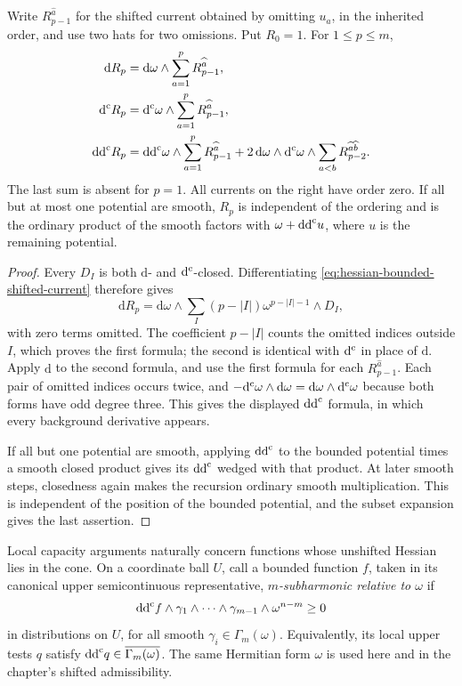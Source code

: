 \begin{proposition}\label{hessian:bounded-current-torsion}
Write $R_{p-1}^{\widehat a}$ for the shifted current obtained by
omitting $u_a$, in the inherited order, and use two hats for two
omissions. Put $R_0=1$. For $1\leq p\leq m$,
\[
 \begin{aligned}
 \mathrm dR_p&=\mathrm d\omega\wedge
                         \sum_{a=1}^pR_{p-1}^{\widehat a},\\
 \mathrm d^{\mathrm c} R_p&=\mathrm d^{\mathrm c}\omega\wedge
                         \sum_{a=1}^pR_{p-1}^{\widehat a},\\
 \mathrm{dd}^{\mathrm{c}} R_p&=\mathrm{dd}^{\mathrm{c}}\omega\wedge
                         \sum_{a=1}^pR_{p-1}^{\widehat a}
       +2\,\mathrm d\omega\wedge\mathrm d^{\mathrm c}\omega\wedge
                         \sum_{a<b}R_{p-2}^{\widehat a\widehat b}.
 \end{aligned}
\]
The last sum is absent for $p=1$. All currents on the right have order
zero. If all but at most one potential are smooth, $R_p$ is independent
of the ordering and is the ordinary product of the smooth factors
with $\omega+\mathrm{dd}^{\mathrm{c}} u$, where $u$ is the remaining potential.
\end{proposition}
\begin{proof}
Every $D_I$ is both $\mathrm d$- and $\mathrm d^{\mathrm c}$-closed. Differentiating
\eqref{eq:hessian-bounded-shifted-current} therefore gives
\[
 \mathrm dR_p=\mathrm d\omega\wedge
 \sum_I(p-|I|)\omega^{p-|I|-1}\wedge D_I,
\]
with zero terms omitted. The coefficient $p-|I|$ counts the omitted
indices outside $I$, which proves the first formula; the second is
identical with $\mathrm d^{\mathrm c}$ in place of $\mathrm d$. Apply $\mathrm d$ to
the second formula, and use the first formula for each
$R_{p-1}^{\widehat a}$. Each pair of omitted indices occurs twice, and
$-\mathrm d^{\mathrm c}\omega\wedge\mathrm d\omega
=\mathrm d\omega\wedge\mathrm d^{\mathrm c}\omega$ because both forms have odd
degree three. This gives the displayed $\mathrm{dd}^{\mathrm{c}}$ formula, in which every
background derivative appears.

If all but one potential are smooth, applying $\mathrm{dd}^{\mathrm{c}}$ to the bounded
potential times a smooth closed product gives its $\mathrm{dd}^{\mathrm{c}}$ wedged
with that product. At later smooth steps, closedness again makes
the recursion ordinary smooth multiplication. This is independent
of the position of the bounded potential, and the subset expansion
gives the last assertion.
\end{proof}

Local capacity arguments naturally concern functions whose unshifted
Hessian lies in the cone. On a coordinate ball $U$, call a bounded
function $f$, taken in its canonical upper semicontinuous representative,
\emph{$m$-subharmonic relative to $\omega$} if
\[
 \mathrm{dd}^{\mathrm{c}} f\wedge\gamma_1\wedge\cdots\wedge\gamma_{m-1}
                                  \wedge\omega^{n-m}\geq0
\]
in distributions on $U$, for all smooth $\gamma_i\in\Gamma_m(\omega)$. Equivalently, its local
upper tests $q$ satisfy
$\mathrm{dd}^{\mathrm{c}} q\in\overline{\Gamma_m(\omega)}$. The same Hermitian form
$\omega$ is used here and in the chapter's shifted admissibility.

